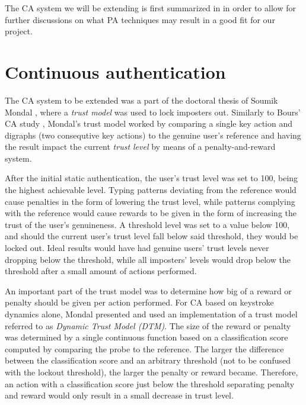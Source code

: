 \documentclass[informationsecurity]{gucmasterproject}
\begin{document}
The CA system we will be extending is first summarized in  in order to allow for further discussions on what PA techniques may result in a good fit for our project.

\section{Continuous authentication}
\label{sec:related-CA}
The CA system to be extended was a part of the doctoral thesis of Soumik Mondal \cite{mondal}, where a \textit{trust model} was used to lock imposters out.
Similarly to Bours' CA study \cite{BOURS201236}, Mondal's trust model worked by comparing a single key action and digraphs (two consequtive key actions) to the genuine user's reference and having the result impact the current \textit{trust level} by means of a penalty-and-reward system.

After the initial static authentication, the user's trust level was set to 100, being the highest achievable level.
Typing patterns deviating from the reference would cause penalties in the form of lowering the trust level, while patterns complying with the reference would cause rewards to be given in the form of increasing the trust of the user's genuineness.
A threshold level was set to a value below 100, and should the current user's trust level fall below said threshold, they would be locked out.
Ideal results would have had genuine users' trust levels never dropping below the threshold, while all imposters' levels would drop below the threshold after a small amount of actions performed.

An important part of the trust model was to determine how big of a reward or penalty should be given per action performed.
For CA based on keystroke dynamics alone, Mondal \cite{mondal} presented and used an implementation of a trust model referred to as \textit{Dynamic Trust Model (DTM)}.
The size of the reward or penalty was determined by a single continuous function based on a classification score computed by comparing the probe to the reference.
The larger the difference between the classification score and an arbitrary threshold (not to be confused with the lockout threshold), the larger the penalty or reward became.
Therefore, an action with a classification score just below the threshold separating penalty and reward would only result in a small decrease in trust level.
\end{document}
